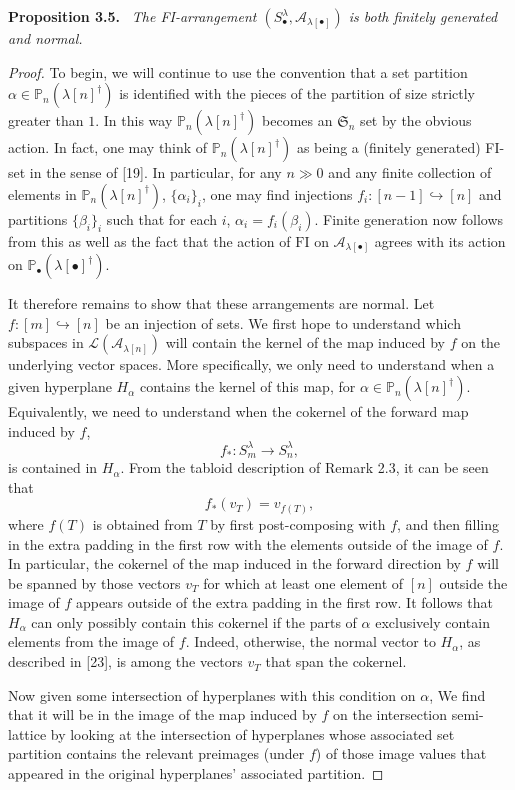 \documentclass[10pt,a4paper]{article}
\newenvironment{sourceblock}[1]{\par\medskip\noindent\textbf{#1.}\ \itshape}{\par\medskip}
\begin{document}
\begin{sourceblock}{Proposition 3.5}
The FI-arrangement $(S_\bullet^\lambda,\mathcal{A}_{\lambda[\bullet]})$ is both finitely generated and normal.
\end{sourceblock}
\begin{proof}
To begin, we will continue to use the convention that a set partition $\alpha\in\mathbb{P}_n(\lambda[n]^\dagger)$ is identified with the pieces of the partition of size strictly greater than $1$. In this way $\mathbb{P}_n(\lambda[n]^\dagger)$ becomes an $\mathfrak{S}_n$ set by the obvious action. In fact, one may think of $\mathbb{P}_n(\lambda[n]^\dagger)$ as being a (finitely generated) FI-set in the sense of [19]. In particular, for any $n\gg0$ and any finite collection of elements in $\mathbb{P}_n(\lambda[n]^\dagger)$, $\{\alpha_i\}_i$, one may find injections $f_i:[n-1]\hookrightarrow[n]$ and partitions $\{\beta_i\}_i$ such that for each $i$, $\alpha_i=f_i(\beta_i)$. Finite generation now follows from this as well as the fact that the action of $\mathrm{FI}$ on $\mathcal{A}_{\lambda[\bullet]}$ agrees with its action on $\mathbb{P}_\bullet(\lambda[\bullet]^\dagger)$.

It therefore remains to show that these arrangements are normal. Let $f:[m]\hookrightarrow[n]$ be an injection of sets. We first hope to understand which subspaces in $\mathcal{L}(\mathcal{A}_{\lambda[n]})$ will contain the kernel of the map induced by $f$ on the underlying vector spaces. More specifically, we only need to understand when a given hyperplane $H_\alpha$ contains the kernel of this map, for $\alpha\in\mathbb{P}_n(\lambda[n]^\dagger)$. Equivalently, we need to understand when the cokernel of the forward map induced by $f$,
\[
 f_*:S_m^\lambda\to S_n^\lambda,
\]
is contained in $H_\alpha$. From the tabloid description of Remark 2.3, it can be seen that
\[
 f_*(v_T)=v_{f(T)},
\]
where $f(T)$ is obtained from $T$ by first post-composing with $f$, and then filling in the extra padding in the first row with the elements outside of the image of $f$. In particular, the cokernel of the map induced in the forward direction by $f$ will be spanned by those vectors $v_T$ for which at least one element of $[n]$ outside the image of $f$ appears outside of the extra padding in the first row. It follows that $H_\alpha$ can only possibly contain this cokernel if the parts of $\alpha$ exclusively contain elements from the image of $f$. Indeed, otherwise, the normal vector to $H_\alpha$, as described in [23], is among the vectors $v_T$ that span the cokernel.

Now given some intersection of hyperplanes with this condition on $\alpha$, We find that it will be in the image of the map induced by $f$ on the intersection semi-lattice by looking at the intersection of hyperplanes whose associated set partition contains the relevant preimages (under $f$) of those image values that appeared in the original hyperplanes' associated partition.
\end{proof}
\end{document}
